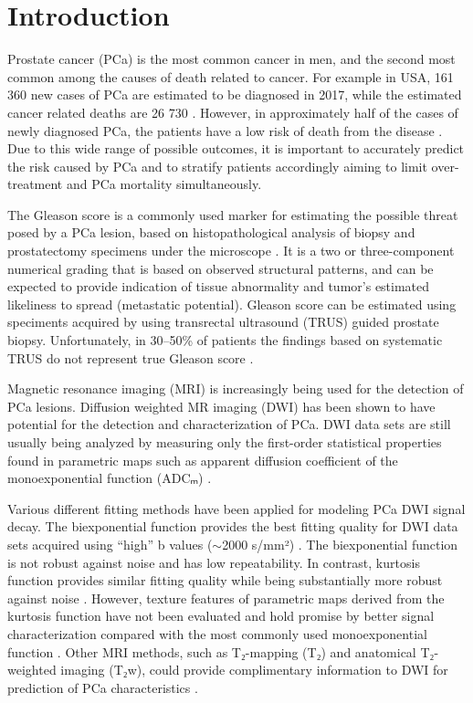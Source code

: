 \section{Introduction}

Prostate cancer (PCa) is the most common cancer in men, and the second most
common among the causes of death related to cancer. For example in USA, 161 360
new cases of PCa are estimated to be diagnosed in 2017, while the estimated
cancer related deaths are 26 730 \citep{Siegel2017}. However, in approximately
half of the cases of newly diagnosed PCa, the patients have a low risk of death
from the disease \citep{Walsh2007, Draisma2003}. Due to this wide range of
possible outcomes, it is important to accurately predict the risk caused by
PCa and to stratify patients accordingly aiming to limit over-treatment and
PCa mortality simultaneously.

The Gleason score is a commonly used marker for estimating the possible threat
posed by a PCa lesion, based on histopathological analysis of biopsy and
prostatectomy specimens under the microscope \citep{Epstein2005}. It is a two or
three-component numerical grading that is based on observed structural patterns,
and can be expected to provide indication of tissue abnormality and tumor's
estimated likeliness to spread (metastatic potential). Gleason score can be
estimated using speciments acquired by using transrectal ultrasound (TRUS)
guided prostate biopsy. Unfortunately, in 30--50\% of patients the findings
based on systematic TRUS do not represent true Gleason score \citep{Nepple2009,
Steinberg1997, Rajinikanth2008}.

Magnetic resonance imaging (MRI) is increasingly being used for the detection of
PCa lesions. Diffusion weighted MR imaging (DWI) has been shown to have
potential for the detection and characterization of PCa. DWI data sets are
still usually being analyzed by measuring only the first-order statistical
properties found in parametric maps such as apparent diffusion coefficient of
the monoexponential function (ADCₘ) \citep{Turkbey2011, Toivonen2015,
Jambor2015Relaxation}.

Various different fitting methods have been applied for modeling PCa DWI signal
decay. The biexponential function \citep{Mulkern2006} provides the best fitting
quality for DWI data sets acquired using ``high'' b values ($\sim$2000 s/mm²)
\citep{Jambor2015Evaluation}. The biexponential function is not robust against
noise and has low repeatability. In contrast, kurtosis function
\citep{Jensen2005} provides similar fitting quality while being substantially
more robust against noise \citep{Jambor2015Evaluation}. However, texture
features of parametric maps derived from the kurtosis function have not been
evaluated and hold promise by better signal characterization compared with the
most commonly used monoexponential function \citep{Toivonen2015}. Other MRI
methods, such as T₂-mapping (T₂) and anatomical T₂-weighted imaging (T₂w), could
provide complimentary information to DWI for prediction of PCa characteristics
\citep{Jambor2015Relaxation}.

